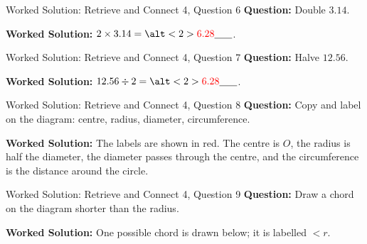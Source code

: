 \documentclass{beamer}
\newcommand{\ablank}[1]{%
  \alt<2>{\textcolor{red}{#1}}{\underline{\phantom{#1}}}%
}
\begin{document}
\begin{frame}{Worked Solution: Retrieve and Connect 4, Question 6}
\small
\textbf{Question:} Double \(3.14\).

\textbf{Worked Solution:} \(2\times3.14=\ablank{6.28}\).
\end{frame}

\begin{frame}{Worked Solution: Retrieve and Connect 4, Question 7}
\small
\textbf{Question:} Halve \(12.56\).

\textbf{Worked Solution:} \(12.56\div2=\ablank{6.28}\).
\end{frame}

\begin{frame}{Worked Solution: Retrieve and Connect 4, Question 8}
\small
\textbf{Question:} Copy and label on the diagram: centre, radius, diameter, circumference.

\begin{center}
\end{center}

\textbf{Worked Solution:} The labels are shown in red. The centre is \(O\), the radius is half the diameter, the diameter passes through the centre, and the circumference is the distance around the circle.
\end{frame}

\begin{frame}{Worked Solution: Retrieve and Connect 4, Question 9}
\small
\textbf{Question:} Draw a chord on the diagram shorter than the radius.

\begin{center}
\end{center}

\textbf{Worked Solution:} One possible chord is drawn below; it is labelled \(<r\).
\end{frame}
\end{document}
